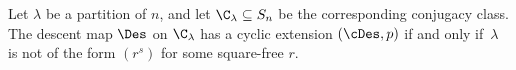 \begin{theorem}\label{thm:main}
    Let $\lambda$ be a partition of $n$, and let
    $\C_\lambda \subseteq S_n$ be the corresponding conjugacy class. 
    The descent map $\Des$ on $\C_\lambda$ has a cyclic extension $(\cDes,p)$ if and only if~$\lambda$ is not of the form $(r^s)$ for some square-free $r$.
\end{theorem}
	

